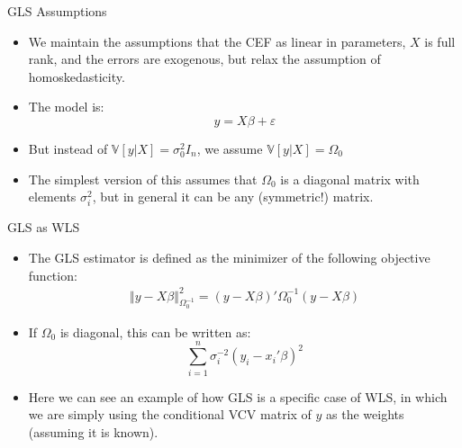 \documentclass[fleqn, 10pt]{beamer}
\newcommand{\V}{\mathbb{V}}
\begin{document}
\begin{frame}{GLS Assumptions}

    \begin{itemize}
		\item We maintain the assumptions that the CEF as linear in parameters, \(X\) is full rank, and the errors are exogenous, but relax the assumption of homoskedasticity.
		\item The model is:
		\[ y = X\beta + \varepsilon \]
		\item But instead of \( \V[y|X] = \sigma_0^2 I_n \), we assume \( \V[y|X] = \Omega_0 \)
		\item The simplest version of this assumes that \( \Omega_0 \) is a diagonal matrix with elements \( \sigma_i^2 \), but in general it can be any (symmetric!) matrix.
	\end{itemize}
	
\end{frame}

\begin{frame}{GLS as WLS}
	
	\begin{itemize}
		\item The GLS estimator is defined as the minimizer of the following objective function:
		\begin{align*}
		\left\Vert y - X \beta \right\Vert^2_{\Omega_0^{-1}} = (y - X\beta)' \Omega_0^{-1} (y-X\beta)
		\end{align*}
		\item If \(\Omega_0 \) is diagonal, this can be written as:
		\[ \sum_{i=1}^{n} \sigma_i^{-2} (y_i - x_i' \beta)^2 \]
		\item Here we can see an example of how GLS is a specific case of WLS, in which we are simply using the conditional VCV matrix of \(y\) as the weights (assuming it is known).
	\end{itemize}
	
\end{frame}
\end{document}
